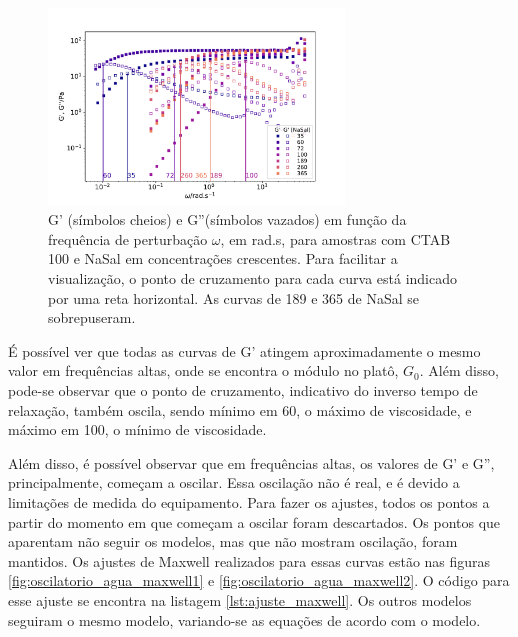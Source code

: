 		\begin{figure}[h]
			\centering
			\includegraphics[width=0.7\textwidth]{imagens/reologia/oscilatorio_agua}
			\caption[Reogramas para água]{G' (símbolos cheios) e G''(símbolos vazados) em função da frequência de perturbação \(\omega\), em rad.s\menosUm, para amostras com CTAB 100\mM{} e NaSal em concentrações crescentes. Para facilitar a visualização, o ponto de cruzamento para cada curva está indicado por uma reta horizontal. As curvas de 189 e 365\mM{} de NaSal se sobrepuseram.}
			\label{fig:oscilatorio_agua}
		\end{figure}
		
		É possível ver que todas as curvas de G' atingem aproximadamente o mesmo valor em frequências altas, onde se encontra o módulo no platô, \(G_0\). Além disso, pode-se observar que o ponto de cruzamento, indicativo do inverso tempo de relaxação, também oscila, sendo mínimo em 60\mM, o máximo de viscosidade, e máximo em 100\mM, o mínimo de viscosidade.  %
		
		Além disso, é possível observar que em frequências altas, os valores de G' e G'', principalmente, começam a oscilar. Essa oscilação não é real, e é devido a limitações de medida do equipamento. Para fazer os ajustes, todos os pontos a partir do momento em que começam a oscilar foram descartados. Os pontos que aparentam não seguir os modelos, mas que não mostram oscilação, foram mantidos. Os ajustes de Maxwell realizados para essas curvas estão nas figuras \ref{fig:oscilatorio_agua_maxwell1} e \ref{fig:oscilatorio_agua_maxwell2}. O código para esse ajuste se encontra na listagem \ref{lst:ajuste_maxwell}. Os outros modelos seguiram o mesmo modelo, variando-se as equações de acordo com o modelo.
		
